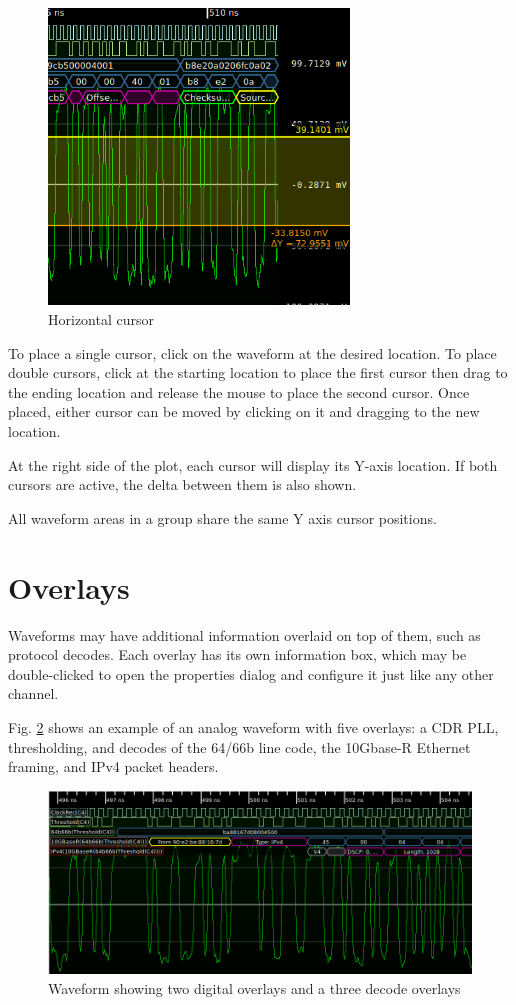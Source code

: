 \begin{figure}[H]
\centering
\includegraphics[width=8cm]{images/horizontal-cursor.png}
\caption{Horizontal cursor}
\label{horizontal-cursor}
\end{figure}

To place a single cursor, click on the waveform at the desired location. To place double cursors, click at the starting
location to place the first cursor then drag to the ending location and release the mouse to place the second cursor.
Once placed, either cursor can be moved by clicking on it and dragging to the new location.

At the right side of the plot, each cursor will display its Y-axis location. If both cursors are active, the delta
between them is also shown.

All waveform areas in a group share the same Y axis cursor positions.

\section{Overlays}

Waveforms may have additional information overlaid on top of them, such as protocol decodes. Each overlay has its own
information box, which may be double-clicked to open the properties dialog and configure it just like any other
channel.

Fig. \ref{overlays} shows an example of an analog waveform with five overlays: a CDR PLL, thresholding, and decodes of
the 64/66b line code, the 10Gbase-R Ethernet framing, and IPv4 packet headers.

\begin{figure}[H]
\centering
\includegraphics[width=14cm]{images/overlays.png}
\caption{Waveform showing two digital overlays and a three decode overlays}
\label{overlays}
\end{figure}

